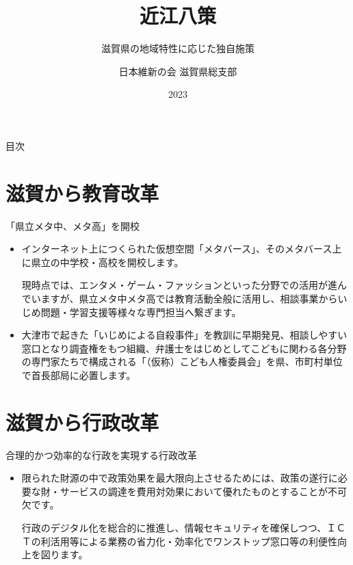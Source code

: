 \documentclass[dvipdfmx]{beamer}
\title{近江八策}
\subtitle{滋賀県の地域特性に応じた独自施策}
\author{日本維新の会 滋賀県総支部}
\date{2023}
\begin{document}
\maketitle

\begin{frame}{目次}
    \tableofcontents
\end{frame}

\section{滋賀から教育改革}
    \begin{frame}{}{}
        \sectionpage
    \end{frame}

    \begin{frame}{「県立メタ中、メタ高」を開校}{}
        \begin{small}
            \begin{itemize}
                \setlength{\parsep}{.5mm}
                \setlength{\itemsep}{2mm}
                \item インターネット上につくられた仮想空間「メタバース」、そのメタバース上に県立の中学校・高校を開校します。\par
                現時点では、エンタメ・ゲーム・ファッションといった分野での活用が進んでいますが、県立メタ中メタ高では教育活動全般に活用し、相談事業からいじめ問題・学習支援等様々な専門担当へ繋ぎます。
                \item 大津市で起きた「いじめによる自殺事件」を教訓に早期発見、相談しやすい窓口となり調査権をもつ組織、弁護士をはじめとしてこどもに関わる各分野の専門家たちで構成される「（仮称）こども人権委員会」を県、市町村単位で首長部局に必置します。
            \end{itemize}
        \end{small}
    \end{frame}

\section{滋賀から行政改革}
    \begin{frame}{}{}
        \sectionpage
    \end{frame}

    \begin{frame}{合理的かつ効率的な行政を実現する行政改革}{}
        \begin{small}
            \begin{itemize}
                \setlength{\parsep}{.5mm}
                \setlength{\itemsep}{2mm}
                \item 限られた財源の中で政策効果を最大限向上させるためには、政策の遂行に必要な財・サービスの調達を費用対効果において優れたものとすることが不可欠です。\par
                行政のデジタル化を総合的に推進し、情報セキュリティを確保しつつ、ＩＣＴの利活用等による業務の省力化・効率化でワンストップ窓口等の利便性向上を図ります。
            \end{itemize}
        \end{small}
    \end{frame}
\end{document}
